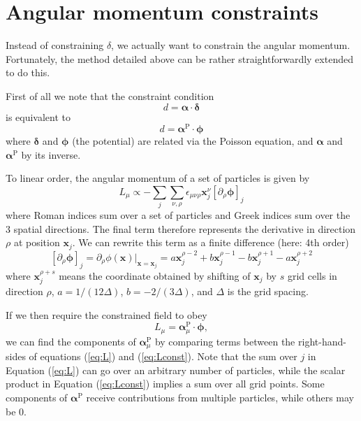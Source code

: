 \documentclass[11pt,a4paper,preprint]{aastex}
\newcommand{\bmath}[1]{\ensuremath{\bm{#1}}}
\renewcommand{\vec}[1]{\bmath{#1}}
\begin{document}
\section{Angular momentum constraints}
\label{sec:AM}

Instead of constraining $\delta$, we actually want to constrain the angular momentum. Fortunately, the method detailed above can be rather straightforwardly extended to do this.

First of all we note that the constraint condition
\begin{equation}
d= \vec{\alpha} \cdot \vec{\delta}
\end{equation}
is equivalent to
\begin{equation}
d= \vec{\alpha}^{\mathrm{P}} \cdot \vec{\phi}
\end{equation}
where $\vec{\delta}$ and $\vec{\phi}$ (the potential) are related via the Poisson equation, and $\vec{\alpha}$ and $\vec{\alpha}^{\mathrm{P}}$ by its inverse.

To linear order, the angular momentum of a set of particles is given by
\begin{equation}
L_{\mu} \propto - \sum_j \sum_{\nu, \rho} \epsilon_{\mu \nu \rho} \vec{x}_j^{\nu} \left[ \partial_{\rho} \vec{\phi} \right] _j
\label{eq:L}
\end{equation}
where Roman indices sum over a set of particles and Greek indices sum over the 3 spatial directions. The final term therefore represents the derivative in direction $\rho$ at position $\vec{x}_j$. We can rewrite this term as a finite difference (here: 4th order)
\begin{equation}
\left[ \partial_{\rho} \vec{\phi} \right] _j =  \partial_{\rho} \phi(\vec{x})|_{\vec{x}=\vec{x}_j} = a \vec{x}_j^{\rho-2} +b\vec{x}_j^{\rho-1} -b \vec{x}_j^{\rho+1} -a \vec{x}_j^{\rho+2}
\end{equation}
where $\vec{x}_j^{\rho+s}$ means the coordinate obtained by shifting of $\vec{x}_j$ by $s$ grid cells in direction $\rho$, $a=1/(12 \Delta) $, $b=-2/(3 \Delta)$, and $\Delta$ is the grid spacing.

If we then require the constrained field to obey
\begin{equation}
L_{\mu} = \vec{\alpha}_{\mu}^{\mathrm{P}} \cdot \vec{\phi},
\label{eq:Lconst}
\end{equation}
we can find the components of $\vec{\alpha}_{\mu}^{\mathrm{P}}$ by comparing terms between the right-hand-sides of equations (\ref{eq:L}) and (\ref{eq:Lconst}). Note that the sum over $j$ in Equation (\ref{eq:L}) can go over an arbitrary number of particles, while the scalar product in Equation (\ref{eq:Lconst}) implies a sum over all grid points. Some components of $\vec{\alpha}^{\mathrm{P}}$ receive contributions from multiple particles, while others may be 0.
\end{document}
